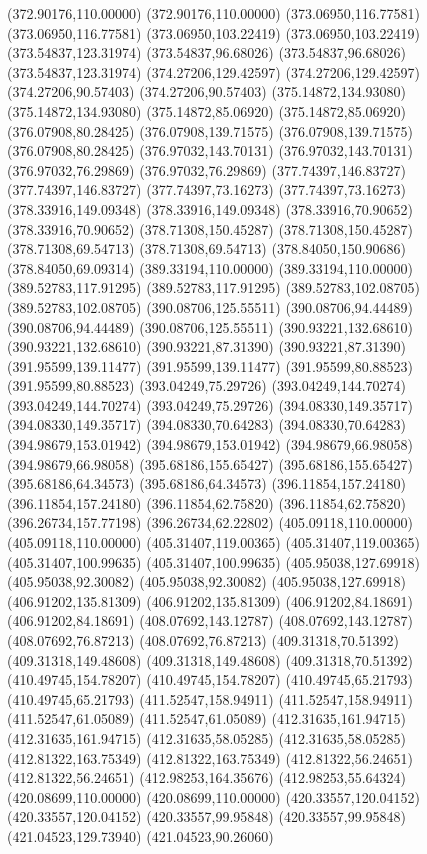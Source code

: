 {(372.90176,110.00000) (372.90176,110.00000) (373.06950,116.77581) (373.06950,116.77581) (373.06950,103.22419) (373.06950,103.22419) (373.54837,123.31974) (373.54837,96.68026)
(373.54837,96.68026) (373.54837,123.31974) (374.27206,129.42597) (374.27206,129.42597) (374.27206,90.57403) (374.27206,90.57403) (375.14872,134.93080) (375.14872,134.93080)
(375.14872,85.06920) (375.14872,85.06920) (376.07908,80.28425) (376.07908,139.71575) (376.07908,139.71575) (376.07908,80.28425) (376.97032,143.70131) (376.97032,143.70131)
(376.97032,76.29869) (376.97032,76.29869) (377.74397,146.83727) (377.74397,146.83727) (377.74397,73.16273) (377.74397,73.16273) (378.33916,149.09348) (378.33916,149.09348)
(378.33916,70.90652) (378.33916,70.90652) (378.71308,150.45287) (378.71308,150.45287) (378.71308,69.54713) (378.71308,69.54713) (378.84050,150.90686) (378.84050,69.09314)
(389.33194,110.00000) (389.33194,110.00000) (389.52783,117.91295) (389.52783,117.91295) (389.52783,102.08705) (389.52783,102.08705) (390.08706,125.55511) (390.08706,94.44489)
(390.08706,94.44489) (390.08706,125.55511) (390.93221,132.68610) (390.93221,132.68610) (390.93221,87.31390) (390.93221,87.31390) (391.95599,139.11477) (391.95599,139.11477)
(391.95599,80.88523) (391.95599,80.88523) (393.04249,75.29726) (393.04249,144.70274) (393.04249,144.70274) (393.04249,75.29726) (394.08330,149.35717) (394.08330,149.35717)
(394.08330,70.64283) (394.08330,70.64283) (394.98679,153.01942) (394.98679,153.01942) (394.98679,66.98058) (394.98679,66.98058) (395.68186,155.65427) (395.68186,155.65427)
(395.68186,64.34573) (395.68186,64.34573) (396.11854,157.24180) (396.11854,157.24180) (396.11854,62.75820) (396.11854,62.75820) (396.26734,157.77198) (396.26734,62.22802)
(405.09118,110.00000) (405.09118,110.00000) (405.31407,119.00365) (405.31407,119.00365) (405.31407,100.99635) (405.31407,100.99635) (405.95038,127.69918) (405.95038,92.30082)
(405.95038,92.30082) (405.95038,127.69918) (406.91202,135.81309) (406.91202,135.81309) (406.91202,84.18691) (406.91202,84.18691) (408.07692,143.12787) (408.07692,143.12787)
(408.07692,76.87213) (408.07692,76.87213) (409.31318,70.51392) (409.31318,149.48608) (409.31318,149.48608) (409.31318,70.51392) (410.49745,154.78207) (410.49745,154.78207)
(410.49745,65.21793) (410.49745,65.21793) (411.52547,158.94911) (411.52547,158.94911) (411.52547,61.05089) (411.52547,61.05089) (412.31635,161.94715) (412.31635,161.94715)
(412.31635,58.05285) (412.31635,58.05285) (412.81322,163.75349) (412.81322,163.75349) (412.81322,56.24651) (412.81322,56.24651) (412.98253,164.35676) (412.98253,55.64324)
(420.08699,110.00000) (420.08699,110.00000) (420.33557,120.04152) (420.33557,120.04152) (420.33557,99.95848) (420.33557,99.95848) (421.04523,129.73940) (421.04523,90.26060)
}
